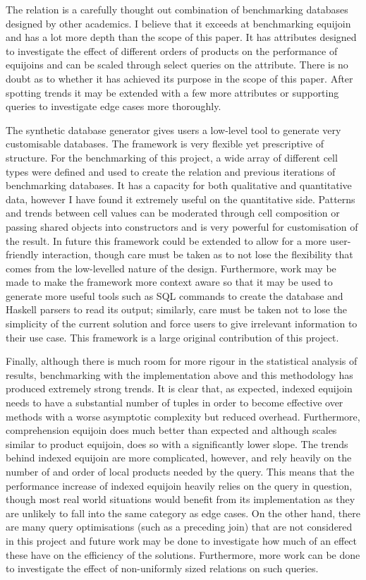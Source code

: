 The  relation is a carefully thought out combination of
benchmarking databases designed by other academics. I
believe that it exceeds at benchmarking equijoin and has a lot more depth than
the scope of this paper. It has attributes designed to investigate the effect of
different orders of products on the performance of equijoins and can be scaled
through select queries on the  attribute. There is no
doubt as to whether it has achieved its purpose in the scope of this paper.
After spotting trends it may be extended with a few more attributes or
supporting queries to investigate edge cases more thoroughly.

The synthetic database generator gives users a low-level tool to generate very
customisable databases. The framework is very flexible yet prescriptive of
structure. For the benchmarking of this project, a wide array of different cell
types were defined and used to create the  relation and
previous iterations of benchmarking databases. It has a capacity for both
qualitative and quantitative data, however I have found it extremely useful on the
quantitative side. Patterns and trends between cell values can be moderated
through cell composition or passing shared objects into constructors and is very
powerful for customisation of the result. In future this framework could be
extended to allow for a more user-friendly interaction, though care must be
taken as to not lose the flexibility that comes from the low-levelled nature of
the design. Furthermore, work may be made to make the framework more context
aware so that it may be used to generate more useful tools such as SQL commands
to create the database and Haskell parsers to read its output; similarly, care
must be taken not to lose the simplicity of the current solution and force users
to give irrelevant information to their use case. This framework is a large
original contribution of this project.

Finally, although there is much room for more rigour in the statistical analysis
of results, benchmarking with the implementation above and this methodology has
produced extremely strong trends. It is clear that, as expected, indexed
equijoin needs to have a substantial number of tuples in order to become
effective over methods with a worse asymptotic complexity but reduced overhead.
Furthermore, comprehension equijoin does much better than expected and although
scales similar to product equijoin, does so with a significantly lower slope.
The trends behind indexed equijoin are more complicated, however, and rely
heavily on the number of and order of local products needed by the query. This
means that the performance increase of indexed equijoin heavily relies on the
query in question, though most real world situations would benefit from its
implementation as they are unlikely to fall into the same category as edge
cases. On the other hand, there are many query optimisations (such as a
preceding join) that are not considered in this project and future work may be
done to investigate how much of an effect these have on the efficiency of the
solutions. Furthermore, more work can be done to investigate the effect of
non-uniformly sized relations on such queries.

